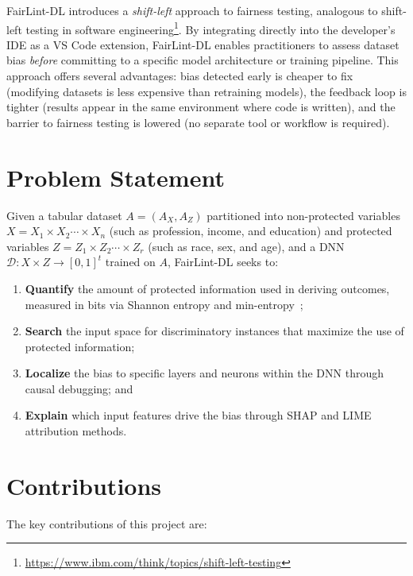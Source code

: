 FairLint-DL introduces a \emph{shift-left} approach to fairness testing, analogous to shift-left testing in software engineering\footnote{\url{https://www.ibm.com/think/topics/shift-left-testing}}. By integrating directly into the developer's IDE as a VS Code extension, FairLint-DL enables practitioners to assess dataset bias \emph{before} committing to a specific model architecture or training pipeline. This approach offers several advantages: bias detected early is cheaper to fix (modifying datasets is less expensive than retraining models), the feedback loop is tighter (results appear in the same environment where code is written), and the barrier to fairness testing is lowered (no separate tool or workflow is required).

\section{Problem Statement}

Given a tabular dataset $A = (A_X, A_Z)$ partitioned into non-protected variables $X = X_1 \times X_2 \cdots \times X_n$ (such as profession, income, and education) and protected variables $Z = Z_1 \times Z_2 \cdots \times Z_r$ (such as race, sex, and age), and a DNN $\mathcal{D}: X \times Z \rightarrow [0,1]^t$ trained on $A$, FairLint-DL seeks to:

\begin{enumerate}[label=(\arabic*)]
    \item \textbf{Quantify} the amount of protected information used in deriving outcomes, measured in bits via Shannon entropy and min-entropy~\cite{dice};
    \item \textbf{Search} the input space for discriminatory instances that maximize the use of protected information;
    \item \textbf{Localize} the bias to specific layers and neurons within the DNN through causal debugging; and
    \item \textbf{Explain} which input features drive the bias through SHAP and LIME attribution methods.
\end{enumerate}

\section{Contributions}

The key contributions of this project are:

